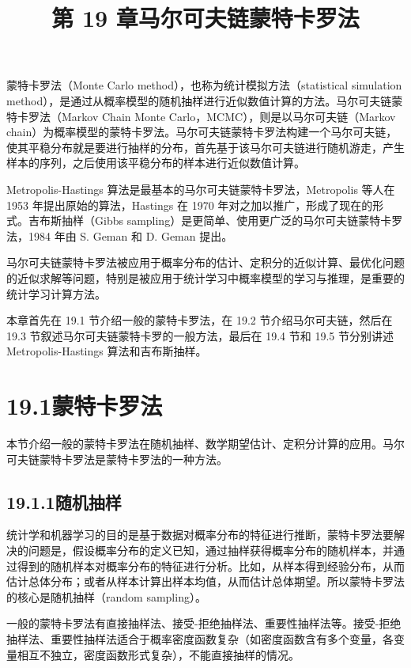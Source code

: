 \documentclass[UTF8,12pt,a4paper,fontset=fandol]{ctexart}
\title{第 19 章\quad 马尔可夫链蒙特卡罗法}
\author{}
\date{}
\begin{document}
\maketitle

蒙特卡罗法（Monte Carlo method），也称为统计模拟方法（statistical simulation method），是通过从概率模型的随机抽样进行近似数值计算的方法。马尔可夫链蒙特卡罗法（Markov Chain Monte Carlo，MCMC），则是以马尔可夫链（Markov chain）为概率模型的蒙特卡罗法。马尔可夫链蒙特卡罗法构建一个马尔可夫链，使其平稳分布就是要进行抽样的分布，首先基于该马尔可夫链进行随机游走，产生样本的序列，之后使用该平稳分布的样本进行近似数值计算。

Metropolis-Hastings 算法是最基本的马尔可夫链蒙特卡罗法，Metropolis 等人在 1953 年提出原始的算法，Hastings 在 1970 年对之加以推广，形成了现在的形式。吉布斯抽样（Gibbs sampling）是更简单、使用更广泛的马尔可夫链蒙特卡罗法，1984 年由 S. Geman 和 D. Geman 提出。

马尔可夫链蒙特卡罗法被应用于概率分布的估计、定积分的近似计算、最优化问题的近似求解等问题，特别是被应用于统计学习中概率模型的学习与推理，是重要的统计学习计算方法。

本章首先在 19.1 节介绍一般的蒙特卡罗法，在 19.2 节介绍马尔可夫链，然后在 19.3 节叙述马尔可夫链蒙特卡罗的一般方法，最后在 19.4 节和 19.5 节分别讲述 Metropolis-Hastings 算法和吉布斯抽样。

\section*{19.1\quad 蒙特卡罗法}

本节介绍一般的蒙特卡罗法在随机抽样、数学期望估计、定积分计算的应用。马尔可夫链蒙特卡罗法是蒙特卡罗法的一种方法。

\subsection*{19.1.1\quad 随机抽样}

统计学和机器学习的目的是基于数据对概率分布的特征进行推断，蒙特卡罗法要解决的问题是，假设概率分布的定义已知，通过抽样获得概率分布的随机样本，并通过得到的随机样本对概率分布的特征进行分析。比如，从样本得到经验分布，从而估计总体分布；或者从样本计算出样本均值，从而估计总体期望。所以蒙特卡罗法的核心是随机抽样（random sampling）。

一般的蒙特卡罗法有直接抽样法、接受-拒绝抽样法、重要性抽样法等。接受-拒绝抽样法、重要性抽样法适合于概率密度函数复杂（如密度函数含有多个变量，各变量相互不独立，密度函数形式复杂），不能直接抽样的情况。
\end{document}
